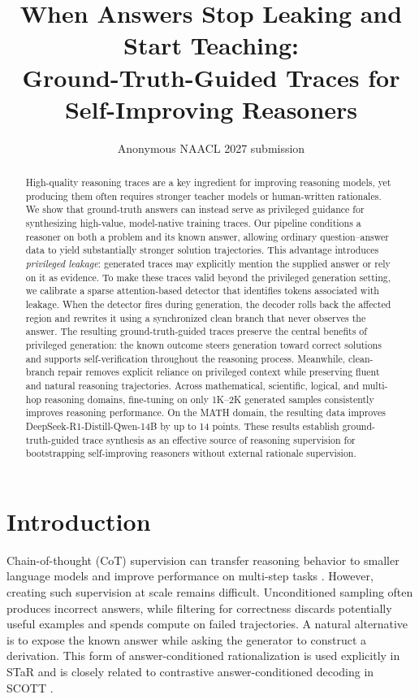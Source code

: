 \documentclass[11pt]{article}
\title{When Answers Stop Leaking and Start Teaching:\\
Ground-Truth-Guided Traces for Self-Improving Reasoners}
\author{Anonymous NAACL 2027 submission}
\begin{document}
\maketitle

\begin{abstract}
High-quality reasoning traces are a key ingredient for improving reasoning
models, yet producing them often requires stronger teacher models or
human-written rationales.  We show that ground-truth answers can instead serve
as privileged guidance for synthesizing high-value, model-native training
traces.  Our pipeline conditions a reasoner on both a problem and its known
answer, allowing ordinary question--answer data to yield substantially stronger
solution trajectories.  This advantage introduces \emph{privileged leakage}:
generated traces may explicitly mention the supplied answer or rely on it as
evidence.  To make these traces valid beyond the privileged generation setting,
we calibrate a
sparse attention-based detector that identifies tokens associated with leakage.
When the detector fires during generation, the decoder rolls back the affected
region and rewrites it using a synchronized clean branch that never observes the
answer.  The resulting ground-truth-guided traces preserve the central benefits
of privileged generation: the known outcome steers generation toward correct
solutions and supports self-verification throughout the reasoning process.
Meanwhile, clean-branch repair removes explicit reliance on privileged context
while preserving fluent and natural reasoning trajectories.  Across
mathematical, scientific, logical, and multi-hop reasoning domains, fine-tuning
on only 1K--2K generated samples consistently improves reasoning performance.
On the MATH domain, the resulting data improves
DeepSeek-R1-Distill-Qwen-14B by up to 14 points.  These results establish
ground-truth-guided trace synthesis as an effective source of reasoning
supervision for bootstrapping self-improving reasoners without external
rationale supervision.
\end{abstract}

\section{Introduction}

Chain-of-thought (CoT) supervision can transfer reasoning behavior to smaller
language models and improve performance on multi-step tasks
\citep{wei2022chain,ho2023reasoningteacher}.  However, creating such supervision
at scale remains difficult.  Unconditioned sampling often produces incorrect
answers, while filtering for correctness discards potentially useful examples
and spends compute on failed trajectories.  A natural alternative is to expose
the known answer while asking the generator to construct a derivation.  This
form of answer-conditioned rationalization is used explicitly in STaR
\citep{zelikman2022star} and is closely related to contrastive answer-conditioned
decoding in SCOTT \citep{wang2023scott}.
\end{document}
